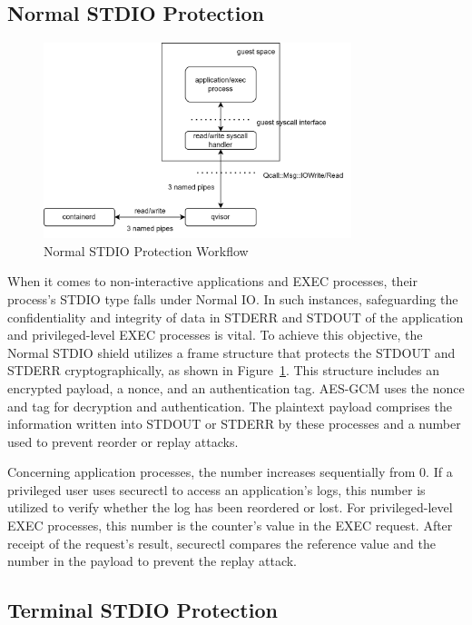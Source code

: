 \subsection{Normal STDIO Protection}

\begin{figure}[htp]
    \centering
    \includegraphics[width=0.8\textwidth]{images/normorl_io.png}
    \caption[Normal STDIO Protection Workflow]{Normal STDIO Protection Workflow}
    \label{fig:normorl_io}
\end{figure}


When it comes to non-interactive applications and EXEC processes, their process's STDIO type falls under Normal IO. In such instances, safeguarding the confidentiality and integrity of data in STDERR and STDOUT of the application and privileged-level 
EXEC processes is vital. To achieve this objective, the Normal STDIO shield utilizes a frame structure that protects the STDOUT and STDERR cryptographically, as shown in Figure~\ref{fig:normorl_io}. This structure includes an encrypted payload, a nonce, and an 
authentication tag. AES-GCM uses the nonce and tag for decryption and authentication. The plaintext payload comprises the information written into STDOUT or STDERR by these processes and a number used to prevent reorder or replay attacks.

Concerning application processes, the number increases sequentially from 0. If a privileged user uses securectl to access an application's logs, this number is utilized to verify whether the log has been reordered or lost. For privileged-level 
EXEC processes, this number is the counter's value in the EXEC request. After receipt of the request's result, securectl compares the reference value and the number in the payload to prevent the replay attack.


\subsection{Terminal STDIO Protection}

